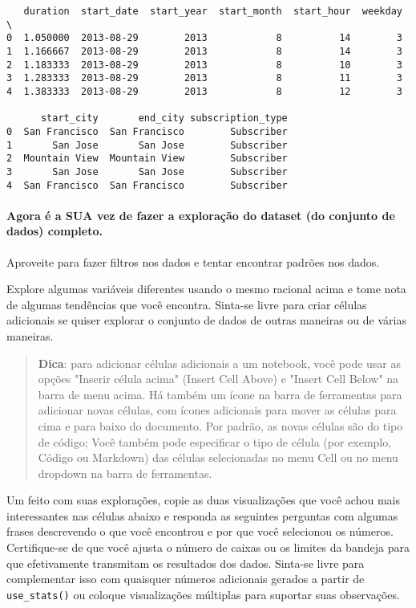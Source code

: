 \documentclass[11pt]{article}
\begin{document}
    
    \begin{verbatim}
   duration  start_date  start_year  start_month  start_hour  weekday  \
0  1.050000  2013-08-29        2013            8          14        3   
1  1.166667  2013-08-29        2013            8          14        3   
2  1.183333  2013-08-29        2013            8          10        3   
3  1.283333  2013-08-29        2013            8          11        3   
4  1.383333  2013-08-29        2013            8          12        3   

      start_city       end_city subscription_type  
0  San Francisco  San Francisco        Subscriber  
1       San Jose       San Jose        Subscriber  
2  Mountain View  Mountain View        Subscriber  
3       San Jose       San Jose        Subscriber  
4  San Francisco  San Francisco        Subscriber  
    \end{verbatim}

    
    \paragraph{Agora é a SUA vez de fazer a exploração do dataset (do
conjunto de dados)
completo.}\label{agora-uxe9-a-sua-vez-de-fazer-a-explorauxe7uxe3o-do-dataset-do-conjunto-de-dados-completo.}

Aproveite para fazer filtros nos dados e tentar encontrar padrões nos
dados.

    Explore algumas variáveis diferentes usando o mesmo racional acima e
tome nota de algumas tendências que você encontra. Sinta-se livre para
criar células adicionais se quiser explorar o conjunto de dados de
outras maneiras ou de várias maneiras.

\begin{quote}
\textbf{Dica}: para adicionar células adicionais a um notebook, você
pode usar as opções "Inserir célula acima" (Insert Cell Above) e "Insert
Cell Below" na barra de menu acima. Há também um ícone na barra de
ferramentas para adicionar novas células, com ícones adicionais para
mover as células para cima e para baixo do documento. Por padrão, as
novas células são do tipo de código; Você também pode especificar o tipo
de célula (por exemplo, Código ou Markdown) das células selecionadas no
menu Cell ou no menu dropdown na barra de ferramentas.
\end{quote}

Um feito com suas explorações, copie as duas visualizações que você
achou mais interessantes nas células abaixo e responda as seguintes
perguntas com algumas frases descrevendo o que você encontrou e por que
você selecionou os números. Certifique-se de que você ajusta o número de
caixas ou os limites da bandeja para que efetivamente transmitam os
resultados dos dados. Sinta-se livre para complementar isso com
quaisquer números adicionais gerados a partir de \texttt{use\_stats()}
ou coloque visualizações múltiplas para suportar suas observações.
\end{document}
